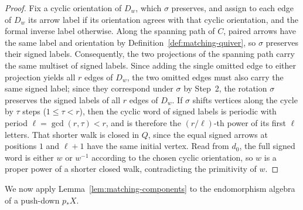 \documentclass[a4paper,reqno,10pt]{amsart}
\theoremstyle{definition}
\numberwithin{equation}{section}
\begin{document}
\begin{proof}
Fix a cyclic orientation of $D_w$, which $\sigma$ preserves, and assign to each edge of $D_w$
its arrow label if its orientation agrees with that cyclic orientation, and the formal
inverse label otherwise. Along the spanning path of $C$, paired arrows have the same label and
orientation by Definition~\ref{def:matching-quiver}, so $\sigma$
preserves their signed labels. Consequently, the two projections of the spanning
path carry the same multiset of signed labels. Since adding the single omitted edge to
either projection yields all $r$ edges of $D_w$, the two omitted edges
must also carry the same signed label; since they correspond under $\sigma$ by Step~2,
the rotation $\sigma$ preserves the signed labels of all $r$ edges of $D_w$. If
$\sigma$ shifts vertices along the cycle by $\tau$ steps ($1\le\tau<r$), then the cyclic word of signed labels is
periodic with period $\ell=\gcd(r,\tau)<r$, and is therefore the
$(r/\ell)$-th power of its first $\ell$ letters. That shorter walk is
closed in $Q$, since the equal signed arrows at positions $1$ and $\ell+1$ have
the same initial vertex. Read from $d_0$, the full signed word is either $w$ or $w^{-1}$
according to the chosen cyclic orientation, so $w$ is a proper
power of a shorter closed walk, contradicting the primitivity of $w$.
\end{proof}

We now apply Lemma~\ref{lem:matching-components} to the endomorphism algebra
of a push-down $p_*X$.
\end{document}
